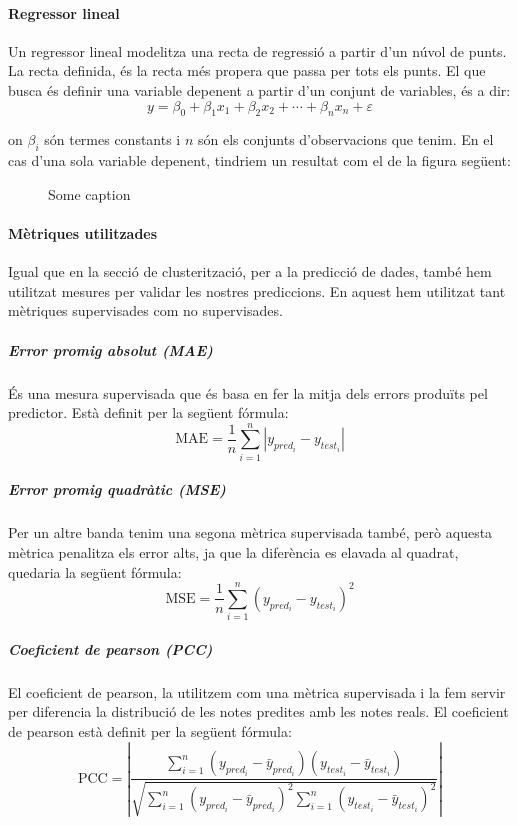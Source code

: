 \documentclass[12pt,a4paper,catalan]{article}
\begin{document}
\newpage

\paragraph{Regressor lineal}
Un regressor lineal modelitza una recta de regressió a partir d'un núvol de punts. La recta definida, és la recta més propera que passa per tots els punts. El que busca és definir una variable depenent a partir d'un conjunt de variables, és a dir:
$$
y =\beta_0+\beta_1 x_1+\beta_2 x_2+ \cdots + \beta_n x_n + \varepsilon
$$

on $\beta_i$ són termes constants i $n$ són els conjunts d'observacions que tenim. En el cas d'una sola variable depenent, tindriem un resultat com el de la figura següent:

\begin{figure}[h]
\centering
{}
\caption{Some caption}
\end{figure}

\paragraph{Mètriques utilitzades}
Igual que en la secció de clusterització, per a la predicció de dades, també hem utilitzat mesures per validar les nostres prediccions. En aquest hem utilitzat tant mètriques supervisades com no supervisades.

\subparagraph{Error promig absolut (MAE)}
És una mesura supervisada que és basa en fer la mitja dels errors produïts pel predictor. Està definit per la següent fórmula:
$$ \mathrm{MAE} = \frac{1}{n}\sum_{i=1}^n \left| y_{pred_i}-y_{test_i}\right| $$

\subparagraph{Error promig quadràtic (MSE)}
Per un altre banda tenim una segona mètrica supervisada també, però aquesta mètrica penalitza els error alts, ja que la diferència es elavada al quadrat, quedaria la següent fórmula:
$$\mathrm{MSE}=\frac{1}{n}\sum_{i=1}^n(y_{pred_i}-y_{test_i})^2$$

\subparagraph{Coeficient de pearson (PCC)}
El coeficient de pearson, la utilitzem com una mètrica supervisada i la fem servir per diferencia la distribució de les notes predites amb les notes reals. El coeficient de pearson està definit per la següent fórmula:
$$\mathrm{PCC} =\left| \frac{\sum_{i=1}^n(y_{pred_i} - \bar{y}_{pred_i})(y_{test_i} - \bar{y}_{test_i})}{\sqrt{\sum_{i=1}^n(y_{pred_i} - \bar{y}_{pred_i})^2  \sum_{i=1}^n(y_{test_i} - \bar{y}_{test_i})^2}}\right|$$
\end{document}
